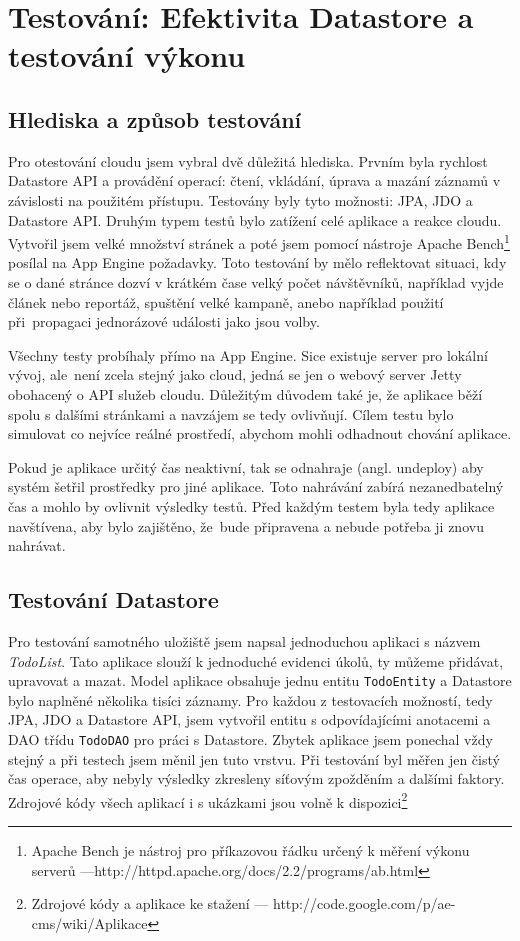 \chapter{Testování: Efektivita Datastore a testování výkonu}

\section{Hlediska a způsob testování}
Pro otestování cloudu jsem vybral dvě důležitá hlediska. Prvním byla rychlost Datastore API a provádění operací: čtení, vkládání, úprava a mazání záznamů v závislosti na použitém přístupu. Testovány byly tyto možnosti: JPA, JDO a Datastore API. Druhým typem testů bylo zatížení celé aplikace a reakce cloudu. Vytvořil jsem velké množství stránek a poté jsem pomocí nástroje Apache Bench\footnote{Apache Bench je nástroj pro příkazovou řádku určený k měření výkonu serverů ---http://httpd.apache.org/docs/2.2/programs/ab.html}  posílal na App Engine požadavky. Toto testování by mělo reflektovat situaci, kdy se o dané stránce dozví v krátkém čase velký počet návštěvníků, například vyjde článek nebo reportáž, spuštění velké kampaně, anebo například použití při~propagaci jednorázové události jako jsou volby.

Všechny testy probíhaly přímo na App Engine. Sice existuje server pro lokální vývoj, ale~není zcela stejný jako cloud, jedná se jen o webový server Jetty obohacený o API služeb cloudu. Důležitým důvodem také je, že aplikace běží spolu s dalšími stránkami a navzájem se tedy ovlivňují. Cílem testu bylo simulovat co nejvíce reálné prostředí, abychom mohli odhadnout chování aplikace.  

Pokud je aplikace určitý čas neaktivní, tak se odnahraje (angl. undeploy) aby systém šetřil prostředky pro jiné aplikace. Toto nahrávání zabírá nezanedbatelný čas a mohlo by ovlivnit výsledky testů. Před každým testem byla tedy aplikace navštívena, aby bylo zajištěno, že~bude připravena a nebude potřeba ji znovu nahrávat.

\section{Testování Datastore}
Pro testování samotného uložiště jsem napsal jednoduchou aplikaci s názvem \emph{TodoList}. Tato aplikace slouží k jednoduché evidenci úkolů, ty můžeme přidávat, upravovat a mazat. Model aplikace obsahuje jednu entitu \verb|TodoEntity| a Datastore bylo naplněné několika tisíci záznamy. Pro každou z testovacích možností, tedy JPA, JDO a Datastore API, jsem vytvořil entitu s odpovídajícími anotacemi a DAO třídu \verb|TodoDAO| pro práci s Datastore. Zbytek aplikace jsem ponechal vždy stejný a při testech jsem měnil jen tuto vrstvu. Při testování byl měřen jen čistý čas operace, aby nebyly výsledky zkresleny síťovým zpožděním a dalšími faktory. Zdrojové kódy všech aplikací i s ukázkami jsou volně k dispozici\footnote{Zdrojové kódy a aplikace ke stažení  --- http://code.google.com/p/ae-cms/wiki/Aplikace}

